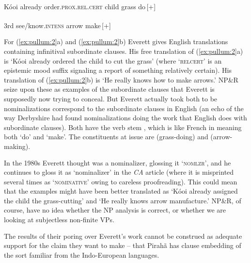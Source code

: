 \documentclass[output=paper,colorlinks,citecolor=brown
]{langscibook}
\begin{document}
\ea
\label{ex:pullum:2}
\ea \gll {} 
          
           \\
        K{\'o}{\textglotstop}oi already order.\textsc{prox}.\textsc{rel.cert} 
           child grass do\,[+]\\
    \ex \gll {}  
               \\
             3rd  see/know.\textsc{intens}  arrow make\,[+]\\
   \z
\z

\noindent
For (\ref{ex:pullum:2}a) and (\ref{ex:pullum:2}b) Everett gives English translations containing
infinitival subordinate clauses. His free translation of (\ref{ex:pullum:2}a) is
`K{\'o}{\textglotstop}oi already ordered the child to cut the grass'
(where `\textsc{relcert}' is an epistemic mood suffix signaling a
report of something relatively certain). His translation of (\ref{ex:pullum:2}b)
is `He really knows how to make arrows.' NP\&R seize upon these as
examples of the subordinate clauses that Everett is supposedly
now trying to conceal. But Everett actually took both to be
nominalizations correspond to the subordinate clauses in English
(an echo of the way Derbyshire had found nominalizations doing the
work that English does with subordinate clauses). Both have the
verb stem , which is like French  in meaning
both `do' and `make'. The constituents at issue are 
(grass-doing) and  (arrow-making).

In the 1980s Everett thought \mbox{} was a nominalizer,
glossing it `\textsc{nomlzr}', and he continues to gloss it as
`nominalizer' in the \textit{CA} article (where it is misprinted
several times as `\textsc{nominative}' owing to careless proofreading).
This could mean that the examples might have been better translated
as `K{\'o}{\textglotstop}oi already assigned the child the grass-cutting'
and `He really knows arrow manufacture.' NP\&R, of course, have no idea
whether the NP analysis is correct, or whether we are looking at
subjectless non-finite VPs.

The results of their poring over Everett's work cannot be construed as
adequate support for the claim they want to make -- that Pirah{\~a}
has clause embedding of the sort familiar from the Indo-European
languages.
\end{document}
